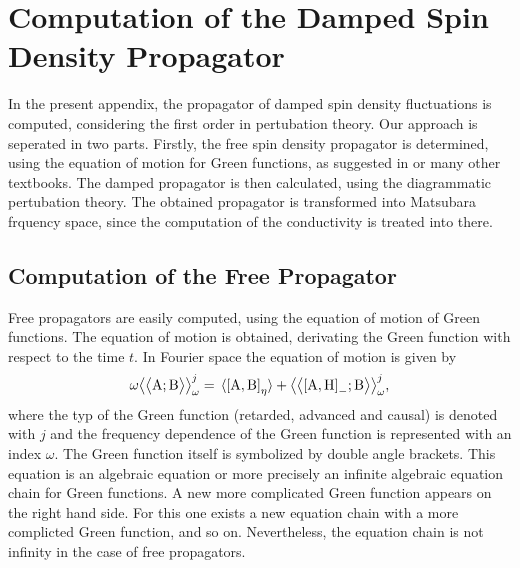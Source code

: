 %
%
%
\chapter{Computation of the Damped Spin Density Propagator}
\label{appch:propagator}
%
%
%
In the present appendix, the propagator of damped spin density fluctuations is computed, considering the first order in pertubation theory.
Our approach is seperated in two parts.
Firstly, the free spin density propagator is determined, using the equation of motion for Green functions, as suggested in \cite{Elk&Gasser} or many other textbooks.
The damped propagator is then calculated, using the diagrammatic pertubation theory.
The obtained propagator is transformed into Matsubara frquency space, since the computation of the conductivity is treated into there.
%
%
\section{Computation of the Free Propagator}
\label{appsec:free propagator}
%
%
Free propagators are easily computed, using the equation of motion of Green functions.
The equation of motion is obtained, derivating the Green function with respect to the time $t$.
In Fourier space the equation of motion is given by
%
\begin{align}
	\omega \green{\mt{A}}{\mt{B}}_{\omega}^{j} = \expval*{\comm{\mt{A}}{\mt{B}}_{\eta}} + \green{\comm{\mt{A}}{\mt{H}}_{-}}{\mt{B}}_{\omega}^{j},
	\label{appeq: algebraic equation chain}
\end{align}
%
where the typ of the Green function (retarded, advanced and causal) is denoted with $j$ and the frequency dependence of the Green function is represented with an index $\omega$.
The Green function itself is symbolized by double angle brackets.
This equation is an algebraic equation or more precisely an infinite algebraic equation chain for Green functions.
A new more complicated Green function appears on the right hand side.
For this one exists a new equation chain with a more complicted Green function, and so on.
Nevertheless, the equation chain is not infinity in the case of free propagators.

